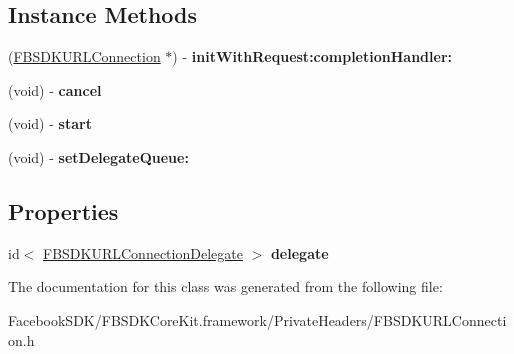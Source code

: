 \subsection*{Instance Methods}
\begin{DoxyCompactItemize}
\item 
\hypertarget{interface_f_b_s_d_k_u_r_l_connection_a3472a41eb2b9f989aeb6d3a2312b25a8}{(\hyperlink{interface_f_b_s_d_k_u_r_l_connection}{F\-B\-S\-D\-K\-U\-R\-L\-Connection} $\ast$) -\/ {\bfseries init\-With\-Request\-:completion\-Handler\-:}}\label{interface_f_b_s_d_k_u_r_l_connection_a3472a41eb2b9f989aeb6d3a2312b25a8}

\item 
\hypertarget{interface_f_b_s_d_k_u_r_l_connection_aae8ec64b01d42ee41ed3ebb78122fcc1}{(void) -\/ {\bfseries cancel}}\label{interface_f_b_s_d_k_u_r_l_connection_aae8ec64b01d42ee41ed3ebb78122fcc1}

\item 
\hypertarget{interface_f_b_s_d_k_u_r_l_connection_a566061db8704ce568fa700acad37e8fa}{(void) -\/ {\bfseries start}}\label{interface_f_b_s_d_k_u_r_l_connection_a566061db8704ce568fa700acad37e8fa}

\item 
\hypertarget{interface_f_b_s_d_k_u_r_l_connection_a5f1a146533ba5616675aadd462041ca7}{(void) -\/ {\bfseries set\-Delegate\-Queue\-:}}\label{interface_f_b_s_d_k_u_r_l_connection_a5f1a146533ba5616675aadd462041ca7}

\end{DoxyCompactItemize}
\subsection*{Properties}
\begin{DoxyCompactItemize}
\item 
\hypertarget{interface_f_b_s_d_k_u_r_l_connection_ad25718a6e952a76488d325ad38804308}{id$<$ \hyperlink{protocol_f_b_s_d_k_u_r_l_connection_delegate-p}{F\-B\-S\-D\-K\-U\-R\-L\-Connection\-Delegate} $>$ {\bfseries delegate}}\label{interface_f_b_s_d_k_u_r_l_connection_ad25718a6e952a76488d325ad38804308}

\end{DoxyCompactItemize}


The documentation for this class was generated from the following file\-:\begin{DoxyCompactItemize}
\item 
Facebook\-S\-D\-K/\-F\-B\-S\-D\-K\-Core\-Kit.\-framework/\-Private\-Headers/F\-B\-S\-D\-K\-U\-R\-L\-Connection.\-h\end{DoxyCompactItemize}
